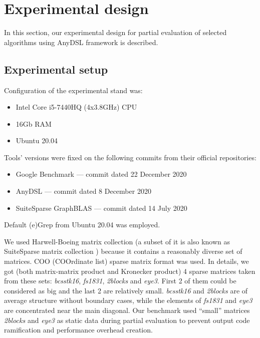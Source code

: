 \documentclass[conference]{IEEEtran}
\begin{document}
\section{Experimental design}

In this section, our experimental design for partial evaluation of selected algorithms using AnyDSL framework is described.

\subsection{Experimental setup}

Configuration of the experimental stand was:
\begin{itemize}
	\item Intel Core i5-7440HQ (4x3.8GHz) CPU
	\item 16Gb RAM
	\item Ubuntu 20.04
\end{itemize}

Tools' versions were fixed on the following commits from their official repositories:
\begin{itemize}
	\item Google Benchmark \cite{gbenchmark} --- commit dated 22 December 2020
	\item AnyDSL \cite{leissa2018anydsl} --- commit dated 8 December 2020
	\item SuiteSparse GraphBLAS \colorbox{red}{\cite{moreira2018implementing}} --- commit dated 14 July 2020
\end{itemize}

Default (e)Grep from Ubuntu 20.04 was employed.

We used Harwell-Boeing matrix collection \cite{duff1992users} (a subset of it is also known as SuiteSparse matrix collection \cite{davis2011university}) because it contains a reasonably diverse set of matrices. COO (COOrdinate list) sparse matrix format was used. In details, we got (both matrix-matrix product and Kronecker product) 4 sparse matrices taken from these sets: \textit{bcsstk16}, \textit{fs1831}, \textit{2blocks} and \textit{eye3}. First 2 of them could be considered as big and the last 2 are relatively small. \textit{bcsstk16} and \textit{2blocks} are of average structure without boundary cases, while  the elements of \textit{fs1831} and \textit{eye3} are concentrated near the main diagonal. Our benchmark used ``small'' matrices \textit{2blocks} and \textit{eye3} as static data during partial evaluation to prevent output code ramification and performance overhead creation.
\end{document}
